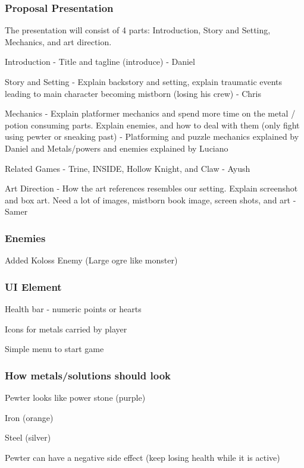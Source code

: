 \documentclass{article}
\begin{document}
\subsubsection{Proposal Presentation}
The presentation will consist of 4 parts: Introduction, Story and Setting, Mechanics, and art direction.
\begin{description}
\item Introduction - Title and tagline (introduce) - Daniel
\item Story and Setting - Explain backstory and setting, explain traumatic events leading to main character becoming mistborn (losing his crew) - Chris
\item Mechanics - Explain platformer mechanics and spend more time on the metal / potion consuming parts. Explain enemies, and how to deal with them (only fight using pewter or sneaking past) - Platforming and puzzle mechanics explained by Daniel and Metals/powers and enemies explained by Luciano
\item Related Games - Trine, INSIDE, Hollow Knight, and Claw - Ayush
\item Art Direction - How the art references resembles our setting. Explain screenshot and box art. Need a lot of images, mistborn book image, screen shots, and art - Samer
\end{description}

\subsubsection{Enemies}
\begin{description}
\item Added Koloss Enemy (Large ogre like monster)
\end{description}

\subsubsection{UI Element}
\begin{description}
\item Health bar - numeric points or hearts
\item Icons for metals carried by player
\item Simple menu to start game
\end{description}

\subsubsection{How metals/solutions should look}
\begin{description}
\item Pewter looks like power stone (purple)
\item Iron (orange)
\item Steel (silver)
\item Pewter can have a negative side effect (keep losing health while it is active)
\end{description}
\end{document}
